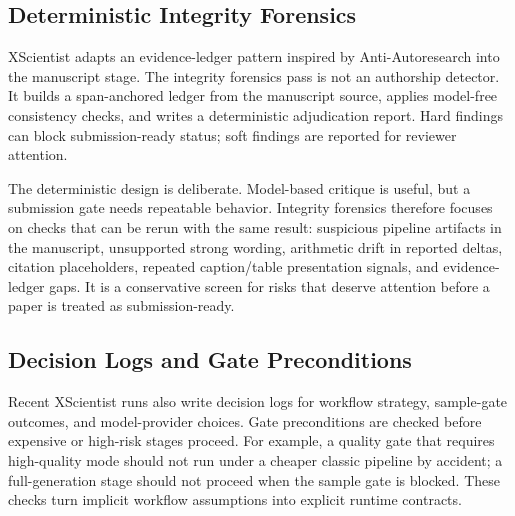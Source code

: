 \documentclass[11pt]{article}
\begin{document}
\subsection{Deterministic Integrity Forensics}

XScientist adapts an evidence-ledger pattern inspired by
Anti-Autoresearch into the manuscript stage. The integrity forensics pass is
not an authorship detector. It builds a span-anchored ledger from the
manuscript source, applies model-free consistency checks, and writes a
deterministic adjudication report. Hard findings can block submission-ready
status; soft findings are reported for reviewer attention.

The deterministic design is deliberate. Model-based critique is useful, but a
submission gate needs repeatable behavior. Integrity forensics therefore
focuses on checks that can be rerun with the same result: suspicious pipeline
artifacts in the manuscript, unsupported strong wording, arithmetic drift in
reported deltas, citation placeholders, repeated caption/table presentation
signals, and evidence-ledger gaps. It is a conservative screen for risks that
deserve attention before a paper is treated as submission-ready.

\subsection{Decision Logs and Gate Preconditions}

Recent XScientist runs also write decision logs for workflow strategy,
sample-gate outcomes, and model-provider choices. Gate preconditions are
checked before expensive or high-risk stages proceed. For example, a quality
gate that requires high-quality mode should not run under a cheaper classic
pipeline by accident; a full-generation stage should not proceed when the
sample gate is blocked. These checks turn implicit workflow assumptions into
explicit runtime contracts.
\end{document}
